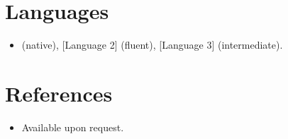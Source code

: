 \documentclass[11pt,a4paper,sans]{moderncv}
\begin{document}
\section{Languages}
\vspace{1pt}
\begin{itemize}
\item [Language 1] (native), [Language 2] (fluent), [Language 3] (intermediate).
\end{itemize}


\section{References}
\vspace{1pt}
\begin{itemize}
\item{Available upon request.}
\end{itemize}
\end{document}
